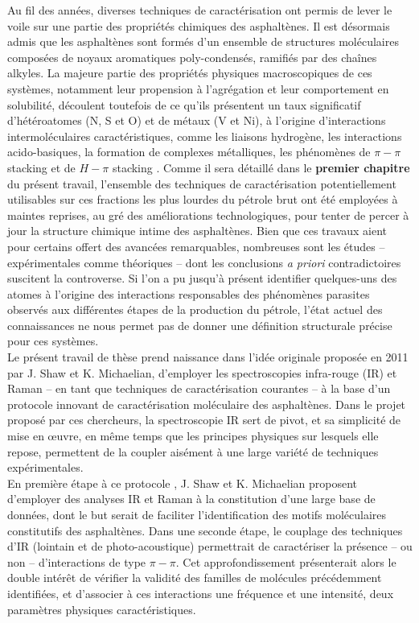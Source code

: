 	Au fil des années, diverses techniques de caractérisation ont permis de lever le voile sur une partie des propriétés chimiques des asphaltènes. Il est désormais admis que les asphaltènes sont formés d'un ensemble de structures moléculaires composées de noyaux aromatiques poly-condensés, ramifiés par des chaînes alkyles. La majeure partie des propriétés physiques macroscopiques de ces systèmes, notamment leur propension à l'agrégation et leur comportement en solubilité, découlent toutefois de ce qu'ils présentent un taux significatif d'hétéroatomes (N, S et O) et de métaux (V et Ni), à l'origine d'interactions intermoléculaires caractéristiques, comme les liaisons hydrogène, les interactions acido-basiques, la formation de complexes métalliques, les phénomènes de \og $\pi-\pi$ stacking \fg{} et de \og $H-\pi$ stacking \fg{}. Comme il sera détaillé dans le \textbf{premier chapitre} du présent travail, l'ensemble des techniques de caractérisation potentiellement utilisables sur ces fractions les plus lourdes du pétrole brut ont été employées à maintes reprises, au gré des améliorations technologiques, pour tenter de percer à jour la structure chimique intime des asphaltènes. Bien que ces travaux aient pour certains offert des avancées remarquables, nombreuses sont les études -- expérimentales comme théoriques -- dont les conclusions \textit{a priori} contradictoires suscitent la controverse. Si l'on a pu jusqu'à présent identifier quelques-uns des atomes à l'origine des interactions responsables des phénomènes parasites observés aux différentes étapes de la production du pétrole, l'état actuel des connaissances ne nous permet pas de donner une définition structurale précise pour ces systèmes. \\
	
	Le présent travail de thèse prend naissance dans l'idée originale proposée en 2011 par J. Shaw et K. Michaelian, d'employer les spectroscopies infra-rouge (IR) et Raman -- en tant que techniques de caractérisation courantes -- à la base d'un \og protocole \fg{} innovant de caractérisation moléculaire des asphaltènes. Dans le projet proposé par ces chercheurs, la spectroscopie IR sert de pivot, et sa simplicité de mise en œuvre, en même temps que les principes physiques sur lesquels elle repose, permettent de la coupler aisément à une large variété de techniques expérimentales.\\
	
	En première étape à ce \og protocole \fg, J. Shaw et K. Michaelian proposent d'employer des analyses IR et Raman à la constitution d'une large base de données, dont le but serait de faciliter l'identification des motifs moléculaires constitutifs des asphaltènes. 
	Dans une seconde étape, le couplage des techniques d'IR (lointain et de photo-acoustique) permettrait de caractériser la présence -- ou non -- d'interactions de type $\pi-\pi$. Cet approfondissement présenterait alors le double intérêt de vérifier la validité des familles de molécules précédemment identifiées, et d'associer à ces interactions une fréquence et une intensité, deux paramètres physiques caractéristiques. \\
	
